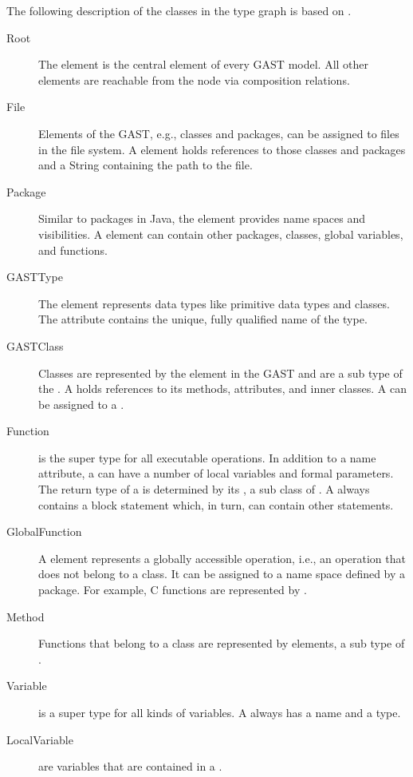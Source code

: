 The following description of the classes in the type graph is based on \cite{Tra11}.

\begin{description}
\item[Root] The  element is the central element of every GAST model. All other elements are reachable from the  node via composition relations.
\item[File] Elements of the GAST, e.g., classes and packages, can be assigned to files in the file system. A  element holds references to those classes and packages and a String containing the path to the file.
\item[Package] Similar to packages in Java, the  element provides name spaces and visibilities. A  element can contain other packages, classes, global variables, and functions.
\item[GASTType] The  element represents data types like primitive data types and classes. The attribute  contains the unique, fully qualified name of the type.
\item[GASTClass] Classes are represented by the element  in the GAST and are a sub type of the . A  holds references to its methods, attributes, and inner classes. A  can be assigned to a .
\item[Function]  is the super type for all executable operations. In addition to a name attribute, a  can have a number of local variables and formal parameters. The return type of a  is determined by its , a sub class of . A  always contains a block statement which, in turn, can contain other statements.
\item[GlobalFunction] A  element represents a globally accessible operation, i.e., an operation that does not belong to a class. It can be assigned to a name space defined by a package. For example, C functions are represented by .
\item[Method] Functions that belong to a class are represented by  elements, a sub type of .
\item[Variable]  is a super type for all kinds of variables. A  always has a name and a type.
\item[LocalVariable]  are variables that are contained in a .

\end{description}
